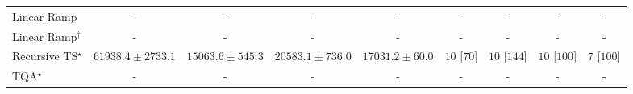 \begin{tabular}{l|cccc|cccc|}
Linear Ramp & {\cellcolor[HTML]{000000}} \color[HTML]{F1F1F1} {\cellcolor{white}} \color{black} - & {\cellcolor[HTML]{000000}} \color[HTML]{F1F1F1} {\cellcolor{white}} \color{black} - & {\cellcolor[HTML]{000000}} \color[HTML]{F1F1F1} {\cellcolor{white}} \color{black} - & {\cellcolor[HTML]{000000}} \color[HTML]{F1F1F1} {\cellcolor{white}} \color{black} - & {\cellcolor[HTML]{000000}} \color[HTML]{F1F1F1} {\cellcolor{white}} \color{black} - & {\cellcolor[HTML]{000000}} \color[HTML]{F1F1F1} {\cellcolor{white}} \color{black} - & {\cellcolor[HTML]{000000}} \color[HTML]{F1F1F1} {\cellcolor{white}} \color{black} - & {\cellcolor[HTML]{000000}} \color[HTML]{F1F1F1} {\cellcolor{white}} \color{black} - \\
Linear Ramp$^\dagger$ & {\cellcolor[HTML]{000000}} \color[HTML]{F1F1F1} {\cellcolor{white}} \color{black} - & {\cellcolor[HTML]{000000}} \color[HTML]{F1F1F1} {\cellcolor{white}} \color{black} - & {\cellcolor[HTML]{000000}} \color[HTML]{F1F1F1} {\cellcolor{white}} \color{black} - & {\cellcolor[HTML]{000000}} \color[HTML]{F1F1F1} {\cellcolor{white}} \color{black} - & {\cellcolor[HTML]{000000}} \color[HTML]{F1F1F1} {\cellcolor{white}} \color{black} - & {\cellcolor[HTML]{000000}} \color[HTML]{F1F1F1} {\cellcolor{white}} \color{black} - & {\cellcolor[HTML]{000000}} \color[HTML]{F1F1F1} {\cellcolor{white}} \color{black} - & {\cellcolor[HTML]{000000}} \color[HTML]{F1F1F1} {\cellcolor{white}} \color{black} - \\
Recursive TS$^\star$ & {\cellcolor[HTML]{A43904}} \color[HTML]{F1F1F1} $61938.4\pm 2733.1$ & {\cellcolor[HTML]{FFFDD9}} \color[HTML]{000000} $15063.6\pm 545.3$ & {\cellcolor[HTML]{FFF6BA}} \color[HTML]{000000} $20583.1\pm 736.0$ & {\cellcolor[HTML]{FFFACE}} \color[HTML]{000000} $17031.2\pm 60.0$ & {\cellcolor[HTML]{49006A}} \color[HTML]{F1F1F1} $10$ [$70$] & {\cellcolor[HTML]{49006A}} \color[HTML]{F1F1F1} $10$ [$144$] & {\cellcolor[HTML]{49006A}} \color[HTML]{F1F1F1} $10$ [$100$] & {\cellcolor[HTML]{CD238F}} \color[HTML]{F1F1F1} $7$ [$100$] \\
TQA$^\star$ & {\cellcolor[HTML]{000000}} \color[HTML]{F1F1F1} {\cellcolor{white}} \color{black} - & {\cellcolor[HTML]{000000}} \color[HTML]{F1F1F1} {\cellcolor{white}} \color{black} - & {\cellcolor[HTML]{000000}} \color[HTML]{F1F1F1} {\cellcolor{white}} \color{black} - & {\cellcolor[HTML]{000000}} \color[HTML]{F1F1F1} {\cellcolor{white}} \color{black} - & {\cellcolor[HTML]{000000}} \color[HTML]{F1F1F1} {\cellcolor{white}} \color{black} - & {\cellcolor[HTML]{000000}} \color[HTML]{F1F1F1} {\cellcolor{white}} \color{black} - & {\cellcolor[HTML]{000000}} \color[HTML]{F1F1F1} {\cellcolor{white}} \color{black} - & {\cellcolor[HTML]{000000}} \color[HTML]{F1F1F1} {\cellcolor{white}} \color{black} - \\

\end{tabular}
